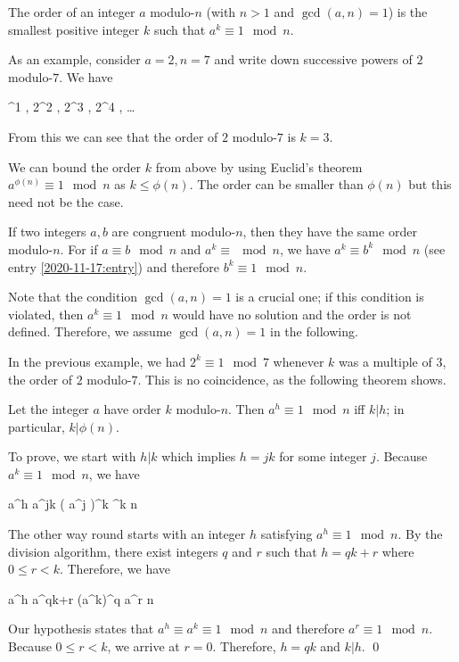 
The order of an integer $a$ modulo-$n$ (with $n>1$ and $\gcd(a,n)=1$) is the smallest positive integer $k$ such that $a^k \equiv 1 \mod n$.

As an example, consider $a = 2, n = 7$ and write down successive powers of $2$ modulo-$7$. We have

^1  , 2^2  , 2^3  , 2^4  , \ldots
\eee

From this we can see that the order of $2$ modulo-$7$ is $k=3$.

We can bound the order $k$ from above by using Euclid's theorem $a^{\phi(n)} \equiv 1 \mod n$ as $k \leq \phi(n)$. The order can be smaller than $\phi(n)$ but this need not be the case.

If two integers $a, b$ are congruent modulo-$n$, then they have the same order modulo-$n$. For if $a \equiv b \mod n$ and $a^k \equiv \mod n$, we have $a^k \equiv b^k \mod n$ (see entry \ref{2020-11-17:entry}) and therefore $b^k \equiv 1 \mod n$.

Note that the condition $\gcd(a,n)=1$ is a crucial one; if this condition is violated, then $a^k \equiv 1 \mod n$ would have no solution and the order is not defined. Therefore, we assume $\gcd(a,n)=1$ in the following.

In the previous example, we had $2^k \equiv 1 \mod 7$ whenever $k$ was a multiple of $3$, the order of $2$ modulo-$7$. This is no coincidence, as the following theorem shows.

\begin{theorem}
  Let the integer $a$ have order $k$ modulo-$n$. Then $a^h \equiv 1 \mod n$ iff $k | h$; in particular, $k | \phi(n)$.
\end{theorem}

To prove, we start with $h | k$ which implies $h = jk$ for some integer $j$. Because $a^k \equiv 1 \mod n$, we have

\bee
a^h \equiv a^{jk} \equiv \left( a^j \right)^k ^k  \mod n
\eee

The other way round starts with an integer $h$ satisfying $a^h \equiv 1 \mod n$. By the division algorithm, there exist integers $q$ and $r$ such that $h = qk+r$ where $0 \leq r < k$. Therefore, we have

\bee
a^h \equiv a^{qk+r} \equiv \left(a^k\right)^q a^r \mod n
\eee

Our hypothesis states that $a^h \equiv a^k \equiv 1 \mod n$ and therefore $a^r \equiv 1 \mod n$. Because $0 \leq r < k$, we arrive at $r=0$. Therefore, $h = qk$ and $k | h$. \qed

